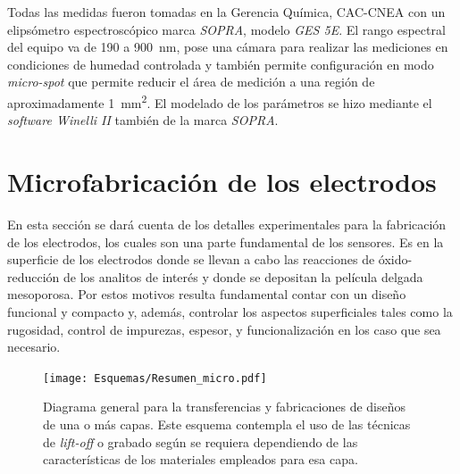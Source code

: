 		Todas las medidas fueron tomadas en la Gerencia Química, CAC-CNEA con un elipsómetro espectroscópico marca \textit{SOPRA}, modelo \textit{GES 5E}. El rango espectral del equipo va de 190 a \SI{900}{\nm}, pose una cámara para realizar las mediciones en condiciones de humedad controlada y también permite configuración en modo \textit{micro-spot} que permite reducir el área de medición a una región de aproximadamente \SI{1}{\mm^2}. El modelado de los parámetros se hizo mediante el \textit{software Winelli II} también de la marca \textit{SOPRA}.
			

\section{Microfabricación de los electrodos}
		
	 En esta sección se dará cuenta de los detalles experimentales para la fabricación de los electrodos, los cuales son una parte fundamental de los sensores. Es en la superficie de los electrodos donde se llevan a cabo las reacciones de óxido-reducción de los analitos de interés y donde se depositan la película delgada mesoporosa. Por estos motivos resulta fundamental contar con un diseño funcional y compacto y, además, controlar los aspectos superficiales tales como la rugosidad, control de impurezas, espesor, y funcionalización en los caso que sea necesario.

	 \begin{figure}[h!]
			  \begin{center}
			  \texttt{[image: Esquemas/Resumen\_micro.pdf]}
			  \caption[Esquema para la transferencia de diseños]{Diagrama general para la transferencias y fabricaciones de diseños de una o más capas. Este esquema contempla el uso de las técnicas de \textit{lift-off }o grabado según se requiera dependiendo de las características de los materiales empleados para esa capa.}
			  \label{esq:micro}
			  \end{center}
			  \end{figure}

